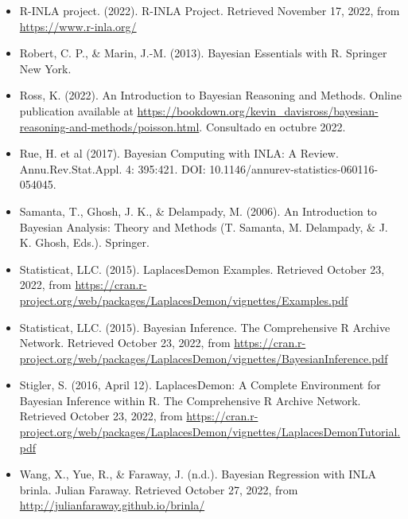 \documentclass[
]{book}
\begin{document}
\begin{itemize}
\item
  R-INLA project. (2022). R-INLA Project. Retrieved November 17, 2022, from \url{https://www.r-inla.org/}
\item
  Robert, C. P., \& Marin, J.-M. (2013). Bayesian Essentials with R. Springer New York.
\item
  Ross, K. (2022). An Introduction to Bayesian Reasoning and Methods. Online publication available at \url{https://bookdown.org/kevin_davisross/bayesian-reasoning-and-methods/poisson.html}. Consultado en octubre 2022.
\item
  Rue, H. et al (2017). Bayesian Computing with INLA: A Review. Annu.Rev.Stat.Appl. 4: 395:421. DOI: 10.1146/annurev-statistics-060116-054045.
\item
  Samanta, T., Ghosh, J. K., \& Delampady, M. (2006). An Introduction to Bayesian Analysis: Theory and Methods (T. Samanta, M. Delampady, \& J. K. Ghosh, Eds.). Springer.
\item
  Statisticat, LLC. (2015). LaplacesDemon Examples. Retrieved October 23, 2022, from \url{https://cran.r-project.org/web/packages/LaplacesDemon/vignettes/Examples.pdf}
\item
  Statisticat, LLC. (2015). Bayesian Inference. The Comprehensive R Archive Network. Retrieved October 23, 2022, from \url{https://cran.r-project.org/web/packages/LaplacesDemon/vignettes/BayesianInference.pdf}
\item
  Stigler, S. (2016, April 12). LaplacesDemon: A Complete Environment for Bayesian Inference within R. The Comprehensive R Archive Network. Retrieved October 23, 2022, from \url{https://cran.r-project.org/web/packages/LaplacesDemon/vignettes/LaplacesDemonTutorial.pdf}
\item
  Wang, X., Yue, R., \& Faraway, J. (n.d.). Bayesian Regression with INLA \textbar{} brinla. Julian Faraway. Retrieved October 27, 2022, from \url{http://julianfaraway.github.io/brinla/}
\end{itemize}

  
\end{document}
